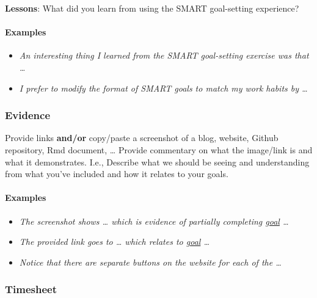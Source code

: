 \documentclass[
  openany]{book}
\providecommand{\tightlist}{%
  \setlength{\itemsep}{0pt}\setlength{\parskip}{0pt}}
\begin{document}
\textbf{Lessons}: What did you learn from using the SMART goal-setting experience?

\hypertarget{examples-3}{%
\paragraph{Examples}\label{examples-3}}

\begin{itemize}
\tightlist
\item
  \emph{An interesting thing I learned from the SMART goal-setting exercise was that \ldots{}}\\
\item
  \emph{I prefer to modify the format of SMART goals to match my work habits by \ldots{}}
\end{itemize}

\hypertarget{evidence}{%
\subsubsection{Evidence}\label{evidence}}

Provide links \textbf{and/or} copy/paste a screenshot of a blog, website, Github repository, Rmd document, \ldots{} Provide commentary on what the image/link is and what it demonstrates. I.e., Describe what we should be seeing and understanding from what you've included and how it relates to your goals.

\hypertarget{examples-4}{%
\paragraph{Examples}\label{examples-4}}

\begin{itemize}
\item
  \emph{The screenshot shows \ldots{} which is evidence of partially completing \protect\hyperlink{goal}{goal} \ldots{}}
\item
  \emph{The provided link goes to \ldots{} which relates to \protect\hyperlink{goal}{goal} \ldots{}}
\item
  \emph{Notice that there are separate buttons on the website for each of the \ldots{}}
\end{itemize}

\hypertarget{timesheet}{%
\subsubsection{Timesheet}\label{timesheet}}
\end{document}
